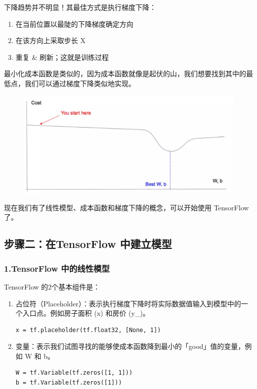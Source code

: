 \documentclass[11pt]{book} %
\begin{document}
下降趋势并不明显！其最佳方式是执行梯度下降：
\begin{enumerate}
    \item 在当前位置以最陡的下降梯度确定方向
    \item 在该方向上采取步长 X
    \item 重复 \& 刷新；这就是训练过程
\end{enumerate}

最小化成本函数是类似的，因为成本函数就像是起伏的山，我们想要找到其中的最低点，我们可以通过梯度下降类似地实现。

\begin{figure}
\centering
\includegraphics[width=0.7\linewidth]{figures/mountain_solution}
\caption{}
\label{fig:mountainsolution}
\end{figure}


现在我们有了线性模型、成本函数和梯度下降的概念，可以开始使用 TensorFlow 了。

\subsection{步骤二：在TensorFlow 中建立模型}

\subsubsection{1.TensorFlow 中的线性模型}

TensorFlow 的2个基本组件是：

\begin{enumerate}
    \item 占位符（Placeholder）：表示执行梯度下降时将实际数据值输入到模型中的一个入口点。例如房子面积  (x) 和房价 (y\_)。
    
    \begin{verbatim}
x = tf.placeholder(tf.float32, [None, 1])  
    \end{verbatim}
    
    \item 变量：表示我们试图寻找的能够使成本函数降到最小的「good」值的变量，例如 W 和 b。
    \begin{verbatim}
W = tf.Variable(tf.zeros([1, 1]))
b = tf.Variable(tf.zeros([1]))
    \end{verbatim}
\end{enumerate}
\end{document}
